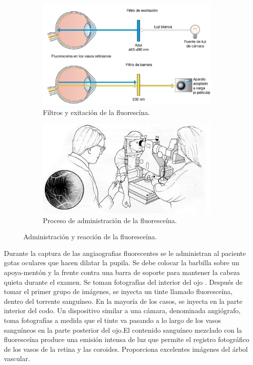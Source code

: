 \begin{figure}[H]
  \centering
	\begin{subfigure}[b]{0.45\textwidth}
        \includegraphics[width=1\textwidth]{./Figures/filtrosluz.pdf}
        \caption{Filtros y exitaci\'on de la fluoresc\'ina.}
        \label{fig:lightfilter}
    \end{subfigure}
	\begin{subfigure}[b]{0.45\textwidth}
        \includegraphics[width=1\textwidth]{./Figures/fluores.jpg}
        \caption{Proceso de administraci\'on de la fluoresce\'ina.}
        \label{fig:af2}
    \end{subfigure}
    
    \caption{Administraci\'on y reacci\'on de la fluoresce\'ina.}
\end{figure}


Durante la captura de las angiaografias fluorecentes se le administran al paciente gotas oculares que hacen dilatar la pupila. Se debe colocar la barbilla sobre un apoya-mentón y la frente contra una barra de soporte para mantener la cabeza quieta durante el examen. Se toman fotografías del interior del ojo . Después de tomar el primer grupo de imágenes, se inyecta un tinte llamado fluoresceína, dentro del  torrente sanguíneo. En la mayoría de los casos, se inyecta en la parte interior del codo. Un dispositivo similar a una cámara, denominada angiógrafo, toma fotografías a medida que el tinte va pasando a lo largo de los vasos sanguíneos en la parte posterior del ojo.El contenido sanguíneo mezclado con la fluoresceína produce una emisión intensa de luz que permite el registro fotográfico de los vasos de la retina y las coroides. Proporciona excelentes imágenes del árbol vascular.

